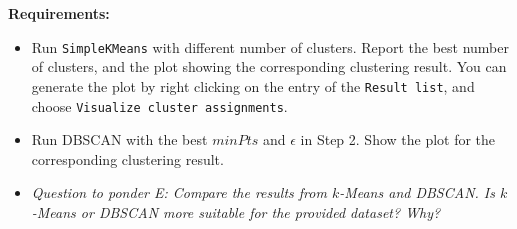 \begin{enumerate}
\textbf{Requirements:}
\begin{itemize}
\item Run {\tt SimpleKMeans} with different number of clusters. Report the best number of clusters, and the plot showing the corresponding clustering result. You can generate the plot by right clicking on the entry of the {\tt Result list}, and choose {\tt Visualize cluster assignments}.
    \item Run DBSCAN with the best $minPts$ and $\epsilon$ in Step 2. Show the plot for the corresponding clustering result.
\item \textit{Question to ponder E: Compare the results from $k$-Means and DBSCAN. Is $k$-Means or DBSCAN more suitable for the provided dataset? Why?}
\end{itemize}

\end{enumerate}